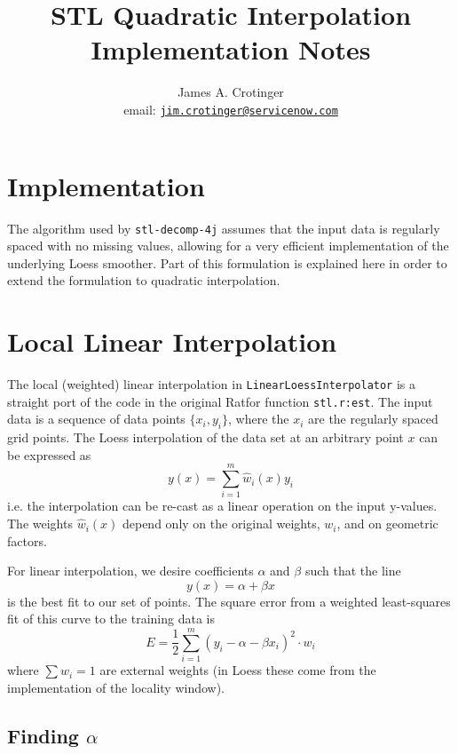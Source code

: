 \documentclass[oneside]{tufte-handout}
\title{STL Quadratic Interpolation \\ Implementation Notes}
\author{James A. Crotinger \\ email: \href{mailto:jim.crotinger@servicenow.com}{\tt jim.crotinger@servicenow.com}}
\newcommand\code[1]{\texttt{#1}}
\begin{document}
\maketitle%

\section{Implementation}

\begin{fullwidth}
The algorithm used by \code{stl-decomp-4j} assumes that the input data is regularly spaced with no missing values,
allowing for a very efficient implementation of the underlying Loess smoother. Part of this formulation is explained here in order to extend the formulation to quadratic interpolation. 

\section{Local Linear Interpolation}

The local (weighted) linear interpolation in \code{LinearLoessInterpolator} is a straight port of the code in the original Ratfor function \code{stl.r:est}. The input data is a sequence of data points $\{x_i, y_i\}$, where the $x_i$ are the regularly spaced grid points. The Loess interpolation of the data set at an arbitrary point $x$ can be expressed as
\begin{equation}\label{eq:interp-def}
  y(x) = \sum_{i = 1}^m \hat{w}_i(x) y_i
\end{equation}
i.e. the interpolation can be re-cast as a linear operation on the input y-values. The weights $\hat{w}_i(x)$ depend only on the original weights, $w_i$, and on geometric factors.

For linear interpolation, we desire coefficients $\alpha$ and $\beta$ such that the line
\begin{equation}\label{eq:linear}
	y(x) = \alpha + \beta x
\end{equation}
is the best fit to our set of points. The square error from a weighted least-squares fit of this curve to the training data is
\begin{equation}\label{eq:mean-square-error}
E = {\frac{1}{2}} \sum_{i=1}^m (y_i - \alpha - \beta x_i)^2 \cdot w_i
\end{equation}
where $\sum w_i = 1$ are external weights (in Loess these come from the implementation of the locality window).

\subsection{Finding $\alpha$}


\end{fullwidth}
\end{document}

